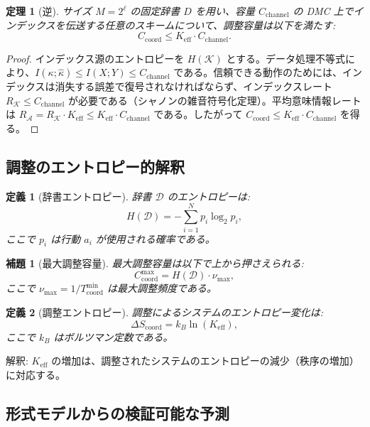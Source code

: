 \documentclass[12pt,a4paper]{ltjsarticle}
\newtheorem{definition}{定義}
\newtheorem{theorem}{定理}
\newtheorem{lemma}{補題}
\begin{document}
	\begin{theorem}[逆]
		サイズ \(M = 2^\ell\) の固定辞書 \(D\) を用い、容量 \(C_{\mathrm{channel}}\) の DMC 上でインデックスを伝送する任意のスキームについて、調整容量は以下を満たす:
		\[
		C_{\mathrm{coord}} \le K_{\mathrm{eff}} \cdot C_{\mathrm{channel}}.
		\]
	\end{theorem}
	
	\begin{proof}
		インデックス源のエントロピーを \(H(\mathcal{K})\) とする。データ処理不等式により、\(I(\kappa;\hat{\kappa}) \le I(X;Y) \le C_{\mathrm{channel}}\) である。信頼できる動作のためには、インデックスは消失する誤差で復号されなければならず、インデックスレート \(R_{\mathcal{K}} \le C_{\mathrm{channel}}\) が必要である（シャノンの雑音符号化定理）。平均意味情報レートは \(R_{\mathcal{A}} = R_{\mathcal{K}} \cdot K_{\mathrm{eff}} \le K_{\mathrm{eff}} \cdot C_{\mathrm{channel}}\) である。したがって \(C_{\mathrm{coord}} \le K_{\mathrm{eff}} \cdot C_{\mathrm{channel}}\) を得る。
	\end{proof}
	
	\subsection{調整のエントロピー的解釈}
	\label{app:entropy}
	
	\begin{definition}[辞書エントロピー]
		辞書 $\mathcal{D}$ のエントロピーは:
		\[
		H(\mathcal{D}) = - \sum_{i=1}^{N} p_i \log_2 p_i,
		\]
		ここで $p_i$ は行動 $a_i$ が使用される確率である。
	\end{definition}
	
	\begin{lemma}[最大調整容量]
		最大調整容量は以下で上から押さえられる:
		\[
		C_{\text{coord}}^{\text{max}} = H(\mathcal{D}) \cdot \nu_{\text{max}},
		\]
		ここで $\nu_{\text{max}} = 1 / T_{\text{coord}}^{\text{min}}$ は最大調整頻度である。
	\end{lemma}
	
	\begin{definition}[調整エントロピー]
		調整によるシステムのエントロピー変化は:
		\[
		\Delta S_{\text{coord}} = k_B \ln(K_{\mathrm{eff}}),
		\]
		ここで $k_B$ はボルツマン定数である。
	\end{definition}
	
	解釈: $K_{\mathrm{eff}}$ の増加は、調整されたシステムのエントロピーの減少（秩序の増加）に対応する。
	
	\subsection{形式モデルからの検証可能な予測}
	\label{app:predictions}
	
\end{document}
